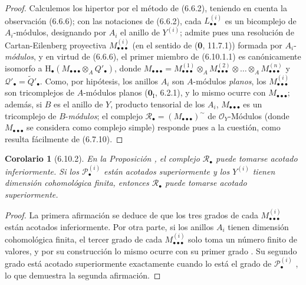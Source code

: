 \documentclass[10pt,oneside,openany]{book}
\theoremstyle{egaenv}\newtheorem*{env}{---}
\theoremstyle{egastatement}
\newtheorem*{corollary}{Corolario}
\theoremstyle{egadescription}
\newcommand{\oldpage}[2][]{\marginnote{\normalfont\scriptsize\textbf{#1}\,|\,#2}\ignorespaces}
\begin{document}
\begin{proof}
\oldpage[III]{172}
Calculemos los hipertor por el método de (6.6.2), teniendo en cuenta la observación
(6.6.6); con las notaciones de (6.6.2), cada
$L_{\bullet\bullet}^{(i)}$ es un bicomplejo de $A_i$-módulos, designando por
$A_i$ el anillo de $Y^{(i)}$; admite pues una resolución de Cartan-Eilenberg
proyectiva $M_{\bullet\bullet\bullet}^{(i)}$ (en el sentido de (\textbf{0}, 11.7.1)) formada por
$A_i$-\emph{módulos}, y en virtud de (6.6.6), el primer miembro de (6.10.1.1) es
canónicamente isomorfo a
$\mathrm H_\bullet(M_{\bullet\bullet\bullet}\otimes_A Q'_\bullet)$, donde
$M_{\bullet\bullet\bullet}=M_{\bullet\bullet\bullet}^{(1)}\otimes_A M_{\bullet\bullet\bullet}^{(2)}\otimes\ldots\otimes_A M_{\bullet\bullet\bullet}^{(n)}$
y $\mathscr Q'_\bullet=\widetilde{Q}'_\bullet$. Como, por hipótesis, los
anillos $A_i$ son $A$-módulos \emph{planos}, los
$M_{\bullet\bullet\bullet}^{(i)}$ son tricomplejos de $A$-módulos planos
($\mathbf{0}_{\mathrm I}$, 6.2.1), y lo mismo ocurre con
$M_{\bullet\bullet\bullet}$; además, si $B$ es el anillo de $Y$, producto
tensorial de los $A_i$, $M_{\bullet\bullet\bullet}$ es un tricomplejo de
$B$-\emph{módulos}; el complejo
$\mathscr R_\bullet=(M_{\bullet\bullet\bullet})^\sim$ de $\mathscr O_Y$-Módulos (donde $M_{\bullet\bullet\bullet}$ se considera como
complejo simple) responde pues a la cuestión, como resulta fácilmente de
(6.7.10).
\end{proof}

\begin{corollary}[6.10.2]
\label{III.6.10.2}
En la Proposición , el complejo
$\mathscr R_\bullet$ puede tomarse acotado inferiormente. Si los
$\mathscr P_\bullet^{(i)}$ están acotados superiormente y los
$Y^{(i)}$ tienen dimensión cohomológica finita, entonces
$\mathscr R_\bullet$ puede tomarse acotado superiormente.
\end{corollary}

\begin{proof}
La primera afirmación se deduce de que los tres grados de cada
$M_{\bullet\bullet\bullet}^{(i)}$ están acotados inferiormente.
Por otra parte, si los anillos $A_i$ tienen dimensión
cohomológica finita, el tercer grado de cada
$M_{\bullet\bullet\bullet}^{(i)}$ solo toma un número finito de
valores, y por su construcción lo mismo ocurre con su primer grado
. Su segundo grado está acotado superiormente
exactamente cuando lo está el grado de $\mathscr P_\bullet^{(i)}$
, lo que demuestra la segunda afirmación.
\end{proof}
\end{document}
